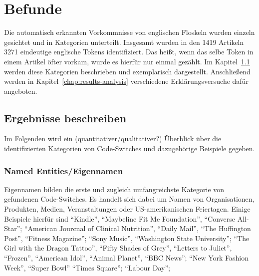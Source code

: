 \section{Befunde}


Die automatisch erkannten Vorkommnisse von englischen Floskeln wurden einzeln gesichtet und in Kategorien unterteilt.
Insgesamt wurden in den 1419 Artikeln 3271 eindeutige englische Tokens identifiziert. %
Das heißt, wenn das selbe Token in einem Artikel öfter vorkam, wurde es hierfür nur einmal gezählt.
Im Kapitel~\ref{chap:results-desc} werden diese Kategorien beschrieben und exemplarisch dargestellt.
Anschließend werden in Kapitel~\ref{chap:results-analysis} verschiedene Erklärungsversuche dafür angeboten.


\subsection{Ergebnisse beschreiben}
\label{chap:results-desc}

Im Folgenden wird ein (quantitativer/qualitativer?) Überblick über die identifizierten Kategorien von Code-Switches und dazugehörige Beispiele gegeben.


\subsubsection{Named Entities/Eigennamen}
Eigennamen bilden die erste und zugleich umfangreichste Kategorie von gefundenen Code-Switches.
Es handelt sich dabei um Namen von Organisationen, Produkten, Medien, Veranstaltungen oder US-amerikanischen Feiertagen.
Einige Beispiele hierfür sind ``Kindle'', ``Maybeline Fit Me Foundation'', ``Converse All-Star''; ``American Jourcnal of Clinical Nutrition'', ``Daily Mail'', ``The Huffington Post'', ``Fitness Magazine'';
``Sony Music'', ``Washington State University'';
``The Girl with the Dragon Tattoo'', ``Fifty Shades of Grey'', ``Letters to Juliet'', ``Frozen'', ``American Idol'', ``Animal Planet'', ``BBC News'';
``New York Fashion Week'', ``Super Bowl''
``Times Square'';
``Labour Day'';

